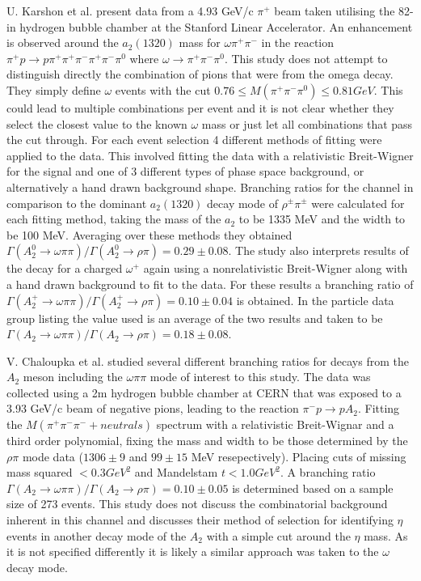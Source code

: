 U. Karshon et al.\cite{karshon1974structure} present data from a 4.93 GeV/c $\pi^+$ beam taken utilising the 82-in hydrogen bubble chamber at the Stanford Linear Accelerator. An enhancement is observed around the $a_2(1320)$ mass for $\omega\pi^+\pi^-$ in the reaction $\pi^{+}p \rightarrow p\pi^+\pi^+\pi^-\pi^+\pi^-\pi^0$ where $\omega \rightarrow \pi^+\pi^-\pi^0$. This study does not attempt to distinguish directly the combination of pions that were from the omega decay. They simply define $\omega$ events with the cut $0.76 \le M(\pi^+\pi^-\pi^0) \le 0.81 GeV$. This could lead to multiple combinations per event and it is not clear whether they select the closest value to the known $\omega$ mass or just let all combinations that pass the cut through. For each event selection 4 different methods of fitting were applied to the data. This involved fitting the data with a relativistic Breit-Wigner for the signal and one of 3 different types of phase space background, or alternatively a hand drawn background shape. Branching ratios for the channel in comparison to the dominant $a_2(1320)$ decay mode of $\rho^{\pm}\pi^{\pm}$ were calculated for each fitting method, taking the mass of the $a_2$ to be 1335 MeV and the width to be 100 MeV. Averaging over these methods they obtained $\Gamma(A_{2}^{0}\rightarrow\omega\pi\pi)/\Gamma(A_{2}^{0}\rightarrow\rho\pi)=0.29\pm0.08$. The study also interprets results of the decay for a charged $\omega^{+}$ again using a nonrelativistic Breit-Wigner along with a hand drawn background to fit to the data. For these results a branching ratio of $\Gamma(A_{2}^{+}\rightarrow\omega\pi\pi)/\Gamma(A_{2}^{+}\rightarrow\rho\pi)=0.10\pm0.04$ is obtained. In the particle data group listing the value used is an average of the two results and taken to be $\Gamma(A_{2}\rightarrow\omega\pi\pi)/\Gamma(A_{2}\rightarrow\rho\pi)=0.18\pm0.08$.

V. Chaloupka et al.\cite{chaloupka1973measurement} studied several different branching ratios for decays from the $A_2$ meson including the $\omega\pi\pi$ mode of interest to this study. The data was collected using a 2m hydrogen bubble chamber at CERN that was exposed to a 3.93 GeV/c beam of negative pions, leading to the reaction $\pi^{-}p\rightarrow pA_{2}$. Fitting the $M(\pi^{+}\pi^{-}\pi^{-}+neutrals)$ spectrum with a relativistic Breit-Wignar and a third order polynomial, fixing the mass and width to be those determined by the $\rho\pi$ mode data ($1306\pm9$ and $99\pm15$ MeV resepectively). Placing cuts of missing mass squared $< 0.3 GeV^{2}$ and Mandelstam $t < 1.0 GeV^{2}$. A branching ratio $\Gamma(A_{2}\rightarrow\omega\pi\pi)/\Gamma(A_{2}\rightarrow\rho\pi)=0.10\pm0.05$ is determined based on a sample size of 273 events. This study does not discuss the combinatorial background inherent in this channel and discusses their method of selection for identifying $\eta$ events in another decay mode of the $A_2$ with a simple cut around the $\eta$ mass. As it is not specified differently it is likely a similar approach was taken to the $\omega$ decay mode. 

